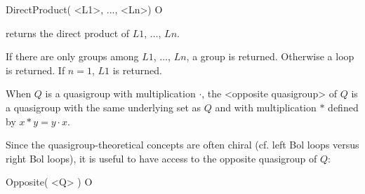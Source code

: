 \>DirectProduct( <L1>, ..., <Ln>) O

returns the direct product of $L1$, $\dots$, $Ln$.

If there are only groups among $L1$, $\dots$, $Ln$, a group is returned.
Otherwise a loop is returned. If $n=1$, $L1$ is returned.


When $Q$ is a quasigroup with multiplication $\cdot$, the <opposite
quasigroup> of $Q$ is a
quasigroup with the same underlying set as $Q$ and with multiplication $*$
defined by $x*y=y\cdot x$.

Since the quasigroup-theoretical concepts are often chiral (cf. left Bol loops
versus right Bol loops), it is useful to have access to the opposite quasigroup
of $Q$:

\>Opposite( <Q> ) O
